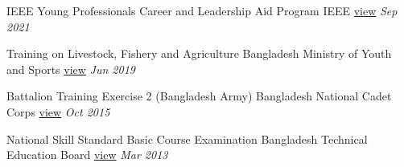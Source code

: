 

\begin{cvhonors}








\cvhonor
    {IEEE Young Professionals Career and Leadership Aid Program} %
    {IEEE \href{https://drive.google.com/file/d/1NK5OwOQ-04fjzlxCaz7df7TGOT_MXJYz/view?usp=sharing}{\textcolor{Cerulean}{view}}} %
    {} %
    {\textit{Sep 2021}} %


\cvhonor
    {Training on Livestock, Fishery and Agriculture} %
    {Bangladesh Ministry of Youth and Sports \href{https://drive.google.com/file/d/1f9bnHS86Y9ogPRHyH2zyf_YWM2Q4sdam/view?usp=sharing}{\textcolor{Cerulean}{view}}} %
    {} %
    {\textit{Jun 2019}} %

 \cvhonor
    {Battalion Training Exercise 2 (Bangladesh Army)} %
    {Bangladesh National Cadet Corps \href{https://drive.google.com/file/d/1fVxHdIusO78UNcnyxsjKDezf8JwLEHvX/view?usp=sharing}{\textcolor{Cerulean}{view}}} %
    {} %
    {\textit{Oct 2015}} %

\cvhonor
    {National Skill Standard Basic Course Examination} %
    {Bangladesh Technical Education Board \href{https://drive.google.com/file/d/1eyFoW6iLL01nKtPQ7zirdRqW9-MZOyQt/view?usp=sharing}{\textcolor{Cerulean}{view}}} %
    {} %
    {\textit{Mar 2013}} %


\end{cvhonors}